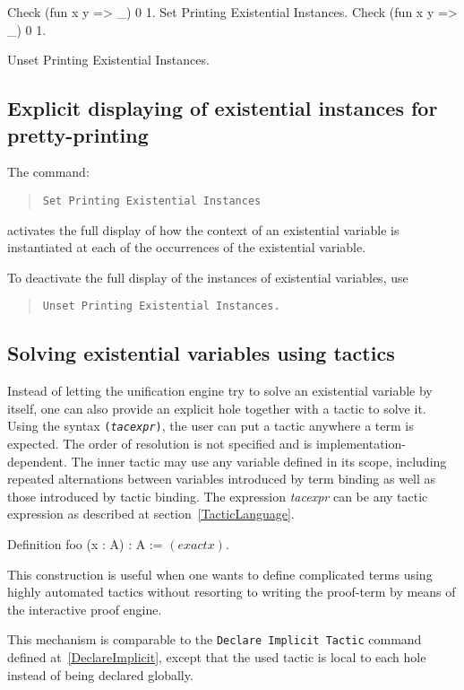 \begin{coq_example}
Check (fun x y => _) 0 1.
Set Printing Existential Instances.
Check (fun x y => _) 0 1.
\end{coq_example}

\begin{coq_eval}
Unset Printing Existential Instances.
\end{coq_eval}

\subsection{Explicit displaying of existential instances for pretty-printing
\label{SetPrintingExistentialInstances}
}

The command:
\begin{quote}
{\tt Set Printing Existential Instances}
\end{quote}
activates the full display of how the context of an existential variable is
instantiated at each of the occurrences of the existential variable.

To deactivate the full display of the instances of existential
variables, use
\begin{quote}
{\tt Unset Printing Existential Instances.}
\end{quote}

\subsection{Solving existential variables using tactics}
\ttindex{\textdollar( \ldots )\textdollar}

\def\expr{\textrm{\textsl{tacexpr}}}

Instead of letting the unification engine try to solve an existential variable
by itself, one can also provide an explicit hole together with a tactic to solve
it. Using the syntax {\tt \textdollar(\expr)\textdollar}, the user can put a
tactic anywhere a term is expected. The order of resolution is not specified and
is implementation-dependent. The inner tactic may use any variable defined in
its scope, including repeated alternations between variables introduced by term
binding as well as those introduced by tactic binding. The expression {\expr}
can be any tactic expression as described at section~\ref{TacticLanguage}.

\begin{coq_example*}
Definition foo (x : A) : A := $( exact x )$.
\end{coq_example*}

This construction is useful when one wants to define complicated terms using
highly automated tactics without resorting to writing the proof-term by means of
the interactive proof engine.

This mechanism is comparable to the {\tt Declare Implicit Tactic} command
defined at~\ref{DeclareImplicit}, except that the used tactic is local to each
hole instead of being declared globally.

